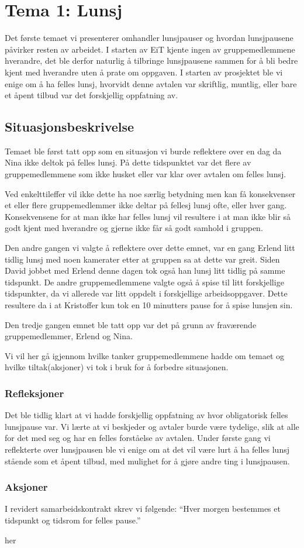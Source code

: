 \chapter{Tema 1: Lunsj}
Det første temaet vi presenterer omhandler lunsjpauser og hvordan lunsjpausene påvirker resten av arbeidet. I starten av EiT kjente ingen av gruppemedlemmene hverandre, det ble derfor naturlig å tilbringe lunsjpausene sammen for å bli bedre kjent med hverandre uten å prate om oppgaven. I starten av prosjektet ble vi enige om å ha felles lunsj, hvorvidt denne avtalen var skriftlig, muntlig, eller bare et åpent tilbud var det forskjellig oppfatning av.

\section{Situasjonsbeskrivelse}
Temaet ble først tatt opp som en situasjon vi burde reflektere over en dag da Nina ikke deltok på felles lunsj. På dette tidspunktet var det flere av gruppemedlemmene som ikke husket eller var klar over avtalen om felles lunsj. 

Ved enkelttileffer vil ikke dette ha noe særlig betydning men kan få konsekvenser et eller flere gruppemedlemmer ikke deltar på fellesj lunsj ofte, eller hver gang. Konsekvensene for at man ikke har felles lunsj vil resultere i at man ikke blir så godt kjent med hverandre og gjerne ikke får så godt samhold i gruppen. 

Den andre gangen vi valgte å reflektere over dette emnet, var en gang Erlend litt tidlig lunsj med noen kamerater etter at gruppen sa at dette var greit. Siden David jobbet med Erlend denne dagen tok også han lunsj litt tidlig på samme tidspunkt. De andre gruppemedlemmene valgte også å spise til litt forskjellige tidspunkter, da vi allerede var litt oppdelt i forskjellige arbeidsoppgaver. Dette resultere da i at Kristoffer kun tok en 10 minutters pause for å spise lunsjen sin. 

Den tredje gangen emnet ble tatt opp var det på grunn av fraværende gruppemedlemmer, Erlend og Nina. 


Vi vil her gå igjennom hvilke tanker gruppemedlemmene hadde om temaet og hvilke tiltak(aksjoner) vi tok i bruk for å forbedre situasjonen.

\subsection*{Refleksjoner}
Det ble tidlig klart at vi hadde forskjellig oppfatning av hvor obligatorisk felles lunsjpause var. Vi lærte at vi beskjeder og avtaler burde være tydelige, slik at alle for det med seg og har en felles forståelse av avtalen. Under første gang vi reflekterte over lunsjpausen ble vi enige om at det vil være lurt å ha felles lunsj stående som et åpent tilbud, med mulighet for å gjøre andre ting i lunsjpausen.

\subsection*{Aksjoner}
I revidert samarbeidskontrakt skrev vi følgende: ``Hver morgen bestemmes et tidspunkt og tidsrom for felles pause.''


her
